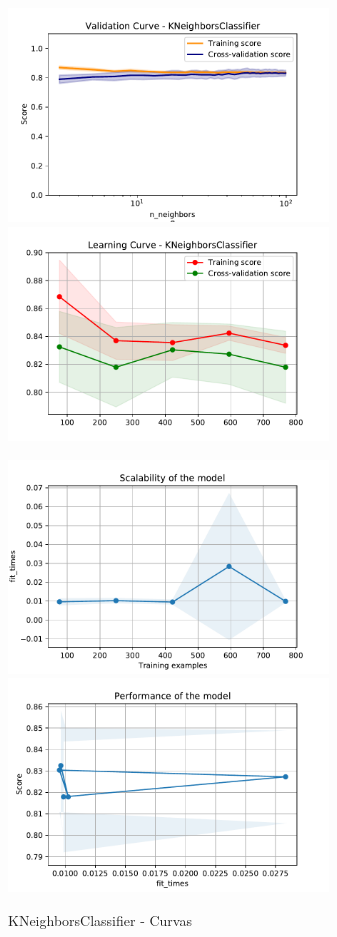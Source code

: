 \documentclass[12pt,twoside]{report}
\begin{document}
\begin{figure}[ht!]
\begin{multicols}{2}
\includegraphics[width=8.5cm]{./code/figures_python/validation_curves/knn.pdf}%
\columnbreak
\includegraphics[width=8.5cm]{./code/figures_python/learning_curves/knn.pdf}%
\end{multicols}

\begin{multicols}{2}
\includegraphics[width=8.5cm]{./code/figures_python/learning_curves/knn_scalability.pdf}%
\columnbreak
\includegraphics[width=8.5cm]{./code/figures_python/learning_curves/knn_performance.pdf}%
\end{multicols}
\caption{KNeighborsClassifier - Curvas}
\label{knn:curves}
\end{figure}
\end{document}
